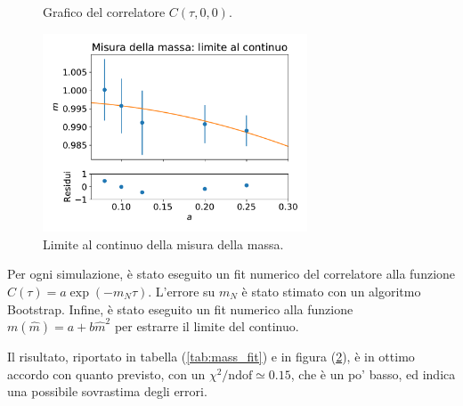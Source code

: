 \documentclass[a4paper,11pt]{article}
\newcommand{\chindof}{\chi^2 / \text{ndof}}
\begin{document}
    \begin{figure}[htb]
        \centering
        \caption{Grafico del correlatore $C(\tau, 0, 0)$.}
        \label{fig:mass_correlator_plot}
    \end{figure}

   
    \begin{figure}[htb]
        \centering
        \includegraphics[width=0.7\textwidth]{figures/mass_continuum.pdf}
        \caption{Limite al continuo della misura della massa.}
        \label{fig:mass_fit}
    \end{figure}
    
    Per ogni simulazione, è stato eseguito un fit numerico del correlatore alla funzione $C(\tau) = a \exp (-m_N\tau)$. L'errore su $m_N$ è stato stimato con un algoritmo Bootstrap. Infine, è stato eseguito un fit numerico alla funzione $m(\hat{m}) = a + b \hat{m}^2$ per estrarre il limite del continuo.
    
    Il risultato, riportato in tabella (\ref{tab:mass_fit}) e in figura (\ref{fig:mass_fit}), è in ottimo accordo con quanto previsto, con un $\chindof \simeq 0.15$, che è un po' basso, ed indica una possibile sovrastima degli errori.
    

    

    
\end{document}
